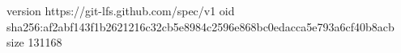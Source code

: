 version https://git-lfs.github.com/spec/v1
oid sha256:af2abf143f1b2621216c32cb5e8984c2596e868bc0edacca5e793a6cf40b8acb
size 131168
